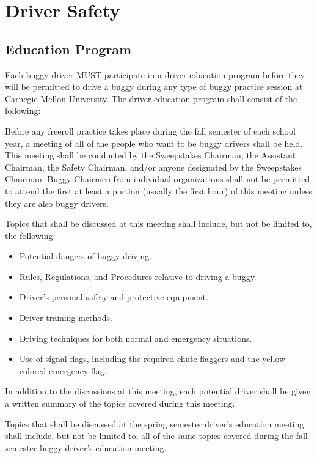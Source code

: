 \section{Driver Safety}

\subsection{Education Program}

	Each buggy driver MUST participate in a driver education program before they
	will be permitted to drive a buggy during any type of buggy practice session at
	Carnegie Mellon University. The driver education program shall consist of the
	following:
	\newline

	Before any freeroll practice takes place during the fall semester of each
	school year, a meeting of all of the people who want to be buggy drivers shall
	be held. This meeting shall be conducted by the Sweepstakes Chairman, the
	Assistant Chairman, the Safety Chairman, and/or anyone designated by the
	Sweepstakes Chairman. Buggy Chairmen from individual organizations shall not be
	permitted to attend the first at least a portion (usually the first hour) of
	this meeting unless they are also buggy drivers.

	Topics that shall be discussed at this meeting shall include, but not be
	limited to, the following:

	\begin{itemize}
		\item Potential dangers of buggy driving.
		\item Rules, Regulations, and Procedures relative to driving a buggy.
		\item Driver's personal safety and protective equipment.
		\item Driver training methods.
		\item Driving techniques for both normal and emergency situations.
		\item Use of signal flags, including the required chute flaggers and the yellow colored emergency flag. 
	\end{itemize}

	In addition to the discussions at this meeting, each potential driver shall be
	given a written summary of the topics covered during this meeting.

	Topics that shall be discussed at the spring semester driver's education
	meeting shall include, but not be limited to, all of the same topics covered
	during the fall semester buggy driver's education meeting.

